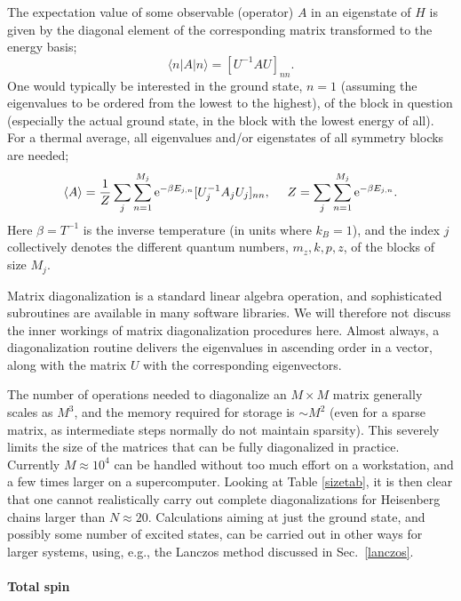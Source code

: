 \documentclass[draft,numberedheadings]{aipproc}
\begin{document}
The expectation value of some observable (operator) $A$ in an eigenstate of $H$ is given by the diagonal element of the corresponding matrix transformed
to the energy basis;
\begin{equation}
\langle n|A|n\rangle =[U^{-1}AU]_{nn}.
\label{anexp}
\end{equation}
One would typically be interested in the ground state, $n=1$ (assuming the eigenvalues to be ordered from the lowest to the highest), of the block 
in question (especially the actual ground state, in the block with the lowest energy of all). For a thermal average, all eigenvalues and/or 
eigenstates of all symmetry blocks are needed;
\begin{equation}
\langle A\rangle = 
\frac{1}{Z}\sum_j \sum_{n=1}^{M_j} {\rm e}^{-\beta E_{j,n}} [U_j^{-1}A_jU_j]_{nn},~~~~Z = \sum_j \sum_{n=1}^{M_j} {\rm e}^{-\beta E_{j,n}}.
\label{aexpect}
\end{equation}
Here $\beta=T^{-1}$ is the inverse temperature  (in units where $k_B=1$), and the index $j$ collectively denotes the different quantum numbers, 
$m_z,k,p,z$, of the blocks of size $M_j$. 

Matrix diagonalization is a standard linear algebra operation, and sophisticated subroutines are available in many software libraries. We will therefore not discuss 
the inner workings of matrix diagonalization procedures here. Almost always, a diagonalization routine delivers the eigenvalues in ascending order in a vector, 
along with the matrix $U$ with the corresponding eigenvectors. 

The number of operations needed to diagonalize an $M\times M$ matrix generally scales as $M^3$, and the memory required for storage is $\sim M^2$ (even for a 
sparse matrix, as intermediate steps normally do not maintain sparsity). This severely 
limits the size of the matrices that can be fully diagonalized in practice. Currently $M \approx 10^4$ can be handled without too much effort on a workstation, 
and a few times larger on a supercomputer. Looking at Table \ref{sizetab}, it is then clear that one cannot realistically carry out complete diagonalizations 
for Heisenberg chains larger than $N \approx 20$. Calculations aiming at just the ground state, and possibly some number of excited states, can be carried 
out in other ways for larger systems, using, e.g., the Lanczos method discussed in Sec.~\ref{lanczos}.

\paragraph{Total spin}
\end{document}
